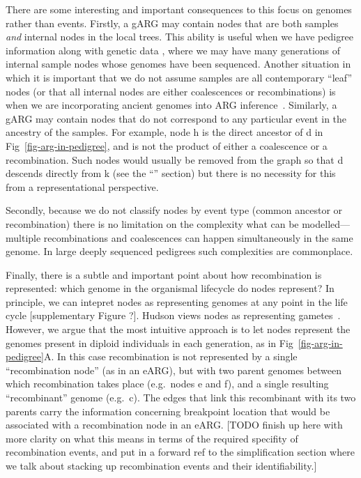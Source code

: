 \documentclass{article}
\begin{document}
There are some interesting and important consequences to this focus on genomes
rather than events.
Firstly, a gARG may contain nodes that are both samples \emph{and}
internal nodes in the local trees.
This ability is useful when we have pedigree information
along with genetic data
\cite[e.g.][]{hayes20191000,RosFreixedes2022,anderson2022genes},
where we may have many generations of internal sample nodes
whose genomes have been sequenced.
Another situation in which it is important that
we do not assume samples are all contemporary ``leaf'' nodes
(or that all internal nodes are either coalescences or recombinations)
is when we are incorporating ancient genomes into ARG
inference~\citep{speidel2021inferring,wohns2022unified}.
Similarly, a gARG may contain nodes that
do not correspond to any particular event in the ancestry of the samples.
For example, node \textsf{h} is the direct ancestor of \textsf{d} in
Fig~\ref{fig-arg-in-pedigree}, and is not the product of either a
coalescence or a recombination. Such nodes would usually be removed
from the graph so that \textsf{d} descends directly from \textsf{k} (see
the ``'' section) but there is no necessity for this from
a representational perspective.

Secondly, because we do not classify nodes by event type
(common ancestor or recombination) there is no limitation
on the complexity what can be modelled---multiple recombinations
and coalescences can happen simultaneously in the same genome.
In large deeply sequenced pedigrees such complexities are commonplace.

Finally, there is a subtle and important point about how recombination
is represented: which genome in the organismal lifecycle
do nodes represent?
In principle, we can intepret nodes as representing genomes
at any point in the life cycle [supplementary Figure ?]. Hudson
views nodes as representing gametes~\citep{hudson1983properties}.
However, we argue that the most intuitive
approach is to let nodes represent the genomes present in diploid
individuals in each generation, as in
Fig~\ref{fig-arg-in-pedigree}A. In this case recombination
is not represented by a single ``recombination node'' (as in an eARG), but with
two parent genomes between which recombination takes place
(e.g.\ nodes \textsf{e} and \textsf{f}), and a
single resulting ``recombinant'' genome (e.g.\ \textsf{c}). The
edges that link this recombinant with its two parents carry the information
concerning breakpoint location that would be associated with a
recombination node in an eARG. [TODO finish up here with more
clarity on what this means in terms of the required specifity
of recombination events, and put in a forward ref to the simplification
section where we talk about stacking up recombination events
and their identifiability.]
\end{document}
